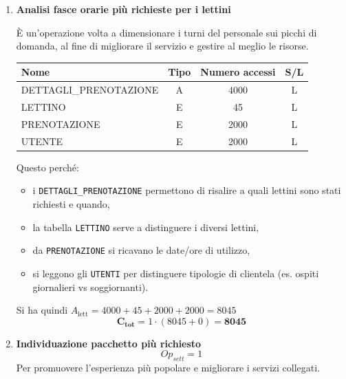 \documentclass[a4paper,12pt]{report}
\begin{document}
\begin{enumerate}
    \item {\large \textbf{Analisi fasce orarie più richieste per i lettini}} \label{op20}

    È un'operazione volta a dimensionare i turni del personale sui picchi di domanda, al fine di migliorare il servizio e gestire al meglio le risorse.

    \begin{table}[H]
    \centering
    \small
    \renewcommand{\arraystretch}{1.15}
    \begin{tabularx}{0.8\textwidth}{|X|c|c|c|}
        \hline
        \rowcolor{gray!20}
        \textbf{Nome} & \textbf{Tipo} & \textbf{Numero accessi} & \textbf{S/L} \\
        \hline
        DETTAGLI\_PRENOTAZIONE & A & 4000 & L \\
        LETTINO & E & 45 & L \\
        PRENOTAZIONE & E & 2000 & L \\
        UTENTE & E & 2000 & L \\
        \hline
    \end{tabularx}
    \end{table}

    Questo perché:  
    \begin{itemize}
        \item i \texttt{DETTAGLI\_PRENOTAZIONE} permettono di risalire a quali lettini sono stati richiesti e quando,  
        \item la tabella \texttt{LETTINO} serve a distinguere i diversi lettini,  
        \item da \texttt{PRENOTAZIONE} si ricavano le date/ore di utilizzo,  
        \item si leggono gli \texttt{UTENTI} per distinguere tipologie di clientela (es. ospiti giornalieri vs soggiornanti).  
    \end{itemize}

    Si ha quindi $A_{\text{lett}} = 4000 + 45 + 2000 + 2000 = 8045$  
    $$\mathbf{C_{tot}} = 1 \cdot (8045 + 0) = \mathbf{8045}$$


    \item {\large \textbf{Individuazione pacchetto più richiesto}} \label{op21}
   $$
   {Op}_{sett} = 1
   $$
    Per promuovere l’esperienza più popolare e migliorare i servizi collegati. 


\end{enumerate}
\end{document}
